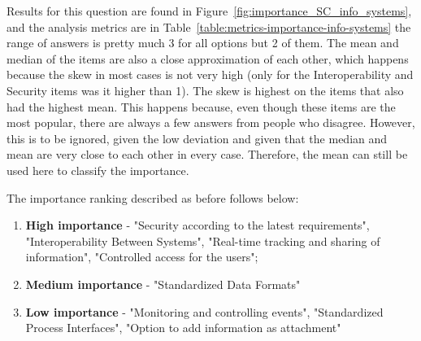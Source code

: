 Results for this question are found in Figure~\ref{fig:importance_SC_info_systems}, and the analysis metrics are in Table~\ref{table:metrics-importance-info-systems} the range of answers is pretty much 3 for all options but 2 of them. The mean and median of the items are also a close approximation of each other, which happens because the skew in most cases is  not very high (only for the Interoperability and Security items was it higher than 1). The skew is highest on the items that also had the highest mean. This happens because, even though these items are the most popular, there are always a few answers from people who disagree. However, this is to be ignored, given the low deviation and given that the median and mean are very close to each other in every case. Therefore, the mean can still be used here to classify the importance.

The importance ranking described as before follows below:

\begin{enumerate}
    \item \textbf{High importance} - "Security according to the latest requirements", "Interoperability Between Systems", "Real-time tracking and sharing of information", "Controlled access for the users";
    \item \textbf{Medium importance} - "Standardized Data Formats"
    \item \textbf{Low importance} - "Monitoring and controlling events", "Standardized Process Interfaces", "Option to add information as attachment"
\end{enumerate}

